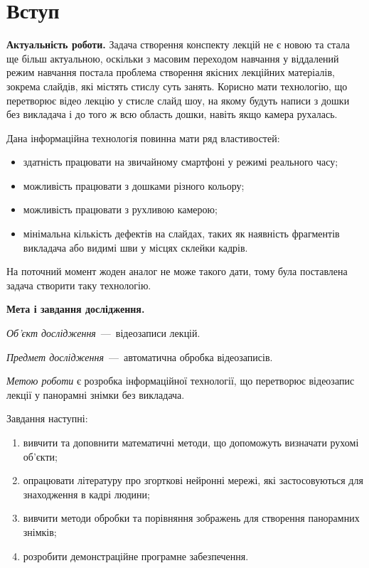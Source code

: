 \chapter*{Вступ}

\textbf{Актуальність роботи.}
Задача створення конспекту лекцій не є новою
та стала ще більш актуальною,
оскільки з масовим переходом навчання у віддалений режим навчання
постала проблема створення якісних
лекційних матеріалів, зокрема слайдів, які містять
стислу суть занять. Корисно мати технологію, що
перетворює відео лекцію у стисле слайд шоу, на
якому будуть написи з дошки без викладача і до того
ж всю область дошки, навіть якщо камера
рухалась. 

Дана інформаційна технологія повинна мати ряд властивостей:
\begin{itemize}
      \item здатність працювати на звичайному смартфоні у режимі реального часу;
      \item можливість працювати з дошками різного кольору;
      \item можливість працювати з рухливою камерою;
      \item мінімальна кількість дефектів на слайдах,
        таких як наявність фрагментів викладача
        або видимі шви у місцях склейки кадрів.
\end{itemize}
На поточний момент жоден аналог не може такого дати, тому була поставлена
задача створити таку технологію.

\textbf{Мета і завдання дослідження.}

\textit{Об'єкт дослідження}~---~відеозаписи лекцій.

\textit{Предмет дослідження}~---~автоматична обробка
відеозаписів.

\textit{Метою роботи} є розробка інформаційної технології, що перетворює 
відеозапис лекції у панорамні знімки без викладача.

Завдання наступні:
\begin{enumerate}
      \item
            вивчити та доповнити математичні методи,
            що допоможуть визначати рухомі об'єкти;
      \item
            опрацювати літературу про згорткові нейронні мережі, які застосовуються
            для знаходження в кадрі людини;
      \item
            вивчити методи обробки та порівняння зображень для створення панорамних знімків;
      \item
            розробити демонстраційне програмне забезпечення.
\end{enumerate}

